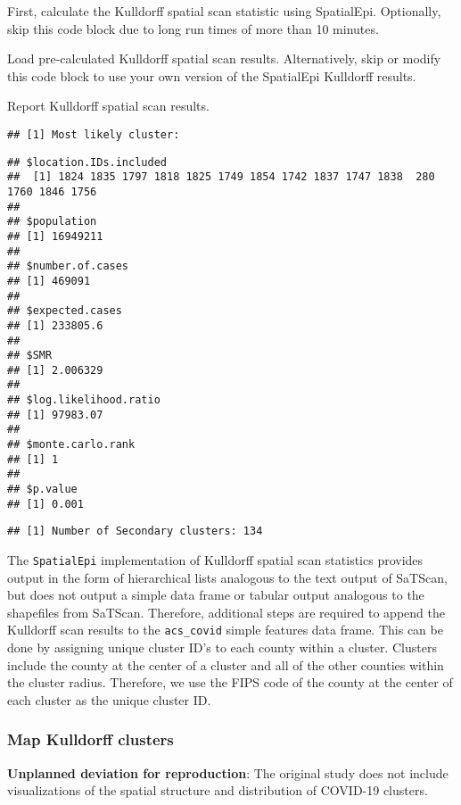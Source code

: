 \documentclass[
]{article}
\begin{document}
First, calculate the Kulldorff spatial scan statistic using SpatialEpi.
Optionally, skip this code block due to long run times of more than 10
minutes.

Load pre-calculated Kulldorff spatial scan results. Alternatively, skip
or modify this code block to use your own version of the SpatialEpi
Kulldorff results.

Report Kulldorff spatial scan results.

\begin{verbatim}
## [1] Most likely cluster:
\end{verbatim}

\begin{verbatim}
## $location.IDs.included
##  [1] 1824 1835 1797 1818 1825 1749 1854 1742 1837 1747 1838  280 1760 1846 1756
## 
## $population
## [1] 16949211
## 
## $number.of.cases
## [1] 469091
## 
## $expected.cases
## [1] 233805.6
## 
## $SMR
## [1] 2.006329
## 
## $log.likelihood.ratio
## [1] 97983.07
## 
## $monte.carlo.rank
## [1] 1
## 
## $p.value
## [1] 0.001
\end{verbatim}

\begin{verbatim}
## [1] Number of Secondary clusters: 134
\end{verbatim}

The \texttt{SpatialEpi} implementation of Kulldorff spatial scan
statistics provides output in the form of hierarchical lists analogous
to the text output of SaTScan, but does not output a simple data frame
or tabular output analogous to the shapefiles from SaTScan. Therefore,
additional steps are required to append the Kulldorff scan results to
the \texttt{acs\_covid} simple features data frame. This can be done by
assigning unique cluster ID's to each county within a cluster. Clusters
include the county at the center of a cluster and all of the other
counties within the cluster radius. Therefore, we use the FIPS code of
the county at the center of each cluster as the unique cluster ID.

\hypertarget{map-kulldorff-clusters}{%
\subsubsection{Map Kulldorff clusters}\label{map-kulldorff-clusters}}

\textbf{Unplanned deviation for reproduction}: The original study does
not include visualizations of the spatial structure and distribution of
COVID-19 clusters.
\end{document}
